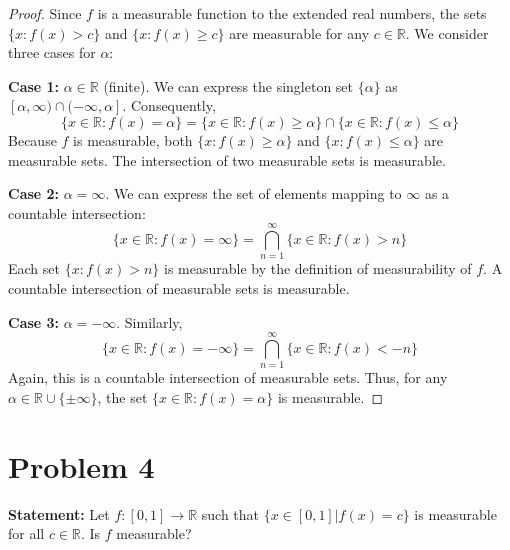 \documentclass[12pt]{article}
\begin{document}
\begin{proof}
Since $f$ is a measurable function to the extended real numbers, the sets $\{x : f(x) > c\}$ and $\{x : f(x) \ge c\}$ are measurable for any $c \in \mathbb{R}$. We consider three cases for $\alpha$:

\textbf{Case 1:} $\alpha \in \mathbb{R}$ (finite).
We can express the singleton set $\{\alpha\}$ as $[\alpha, \infty) \cap (-\infty, \alpha]$. Consequently,
\[
\{x \in \mathbb{R} : f(x) = \alpha\} = \{x \in \mathbb{R} : f(x) \ge \alpha\} \cap \{x \in \mathbb{R} : f(x) \le \alpha\}
\]
Because $f$ is measurable, both $\{x : f(x) \ge \alpha\}$ and $\{x : f(x) \le \alpha\}$ are measurable sets. The intersection of two measurable sets is measurable.

\textbf{Case 2:} $\alpha = \infty$.
We can express the set of elements mapping to $\infty$ as a countable intersection:
\[
\{x \in \mathbb{R} : f(x) = \infty\} = \bigcap_{n=1}^{\infty} \{x \in \mathbb{R} : f(x) > n\}
\]
Each set $\{x : f(x) > n\}$ is measurable by the definition of measurability of $f$. A countable intersection of measurable sets is measurable.

\textbf{Case 3:} $\alpha = -\infty$.
Similarly,
\[
\{x \in \mathbb{R} : f(x) = -\infty\} = \bigcap_{n=1}^{\infty} \{x \in \mathbb{R} : f(x) < -n\}
\]
Again, this is a countable intersection of measurable sets. 
Thus, for any $\alpha \in \mathbb{R} \cup \{\pm\infty\}$, the set $\{x \in \mathbb{R} : f(x) = \alpha\}$ is measurable.
\end{proof}

\section*{Problem 4}
\textbf{Statement:} Let $f:[0,1]\rightarrow\mathbb{R}$ such that $\{x\in[0,1]|f(x)=c\}$ is measurable for all $c\in\mathbb{R}$. Is $f$ measurable?
\end{document}
